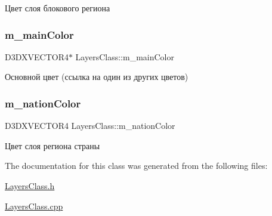 Цвет слоя блокового региона 

\mbox{\label{class_layers_class_a4f6568a3075885bef47e3924ba2942c7}} 
\subsubsection{\texorpdfstring{m\+\_\+main\+Color}{m\_mainColor}}
{\footnotesize\ttfamily D3\+D\+X\+V\+E\+C\+T\+O\+R4$\ast$ Layers\+Class\+::m\+\_\+main\+Color\hspace{0.3cm}{\ttfamily [private]}}



Основной цвет (ссылка на один из других цветов) 

\mbox{\label{class_layers_class_ab3ac3d76407316dff008f31b85303662}} 
\subsubsection{\texorpdfstring{m\+\_\+nation\+Color}{m\_nationColor}}
{\footnotesize\ttfamily D3\+D\+X\+V\+E\+C\+T\+O\+R4 Layers\+Class\+::m\+\_\+nation\+Color\hspace{0.3cm}{\ttfamily [private]}}



Цвет слоя региона страны 



The documentation for this class was generated from the following files\+:\begin{DoxyCompactItemize}
\item 
\hyperlink{_layers_class_8h}{Layers\+Class.\+h}\item 
\hyperlink{_layers_class_8cpp}{Layers\+Class.\+cpp}\end{DoxyCompactItemize}
